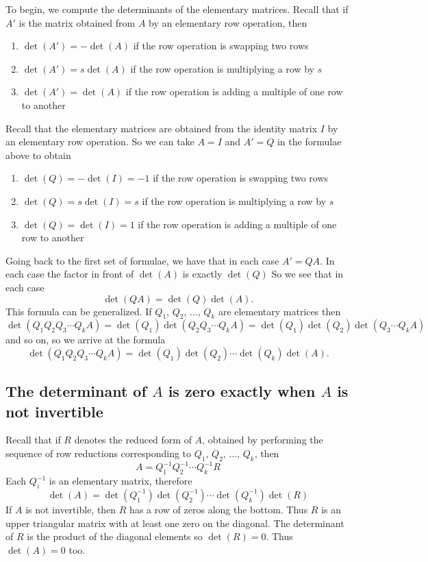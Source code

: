 To begin, we compute the determinants of the elementary
matrices. Recall that if $A'$ is the matrix obtained from $A$ by an
elementary row operation, then
\begin{enumerate}[(1)]
\item $\det(A') = -\det(A)$ if the row operation is swapping two rows
\item $\det(A') = s\det(A)$ if the row operation is multiplying a row by $s$
\item $\det(A') = \det(A)$ if the row operation is adding a multiple
of one row to another
\end{enumerate}
Recall that the elementary matrices are obtained from the identity
matrix $I$ by an elementary row operation. So we can take $A=I$ and
$A'=Q$ in the formulae above to obtain
\begin{enumerate}[(1)]
\item $\det(Q) = -\det(I)=-1$ if the row operation is swapping two rows
\item $\det(Q) = s\det(I)=s$ if the row operation is multiplying a row by $s$
\item $\det(Q) = \det(I)=1$ if the row operation is adding a multiple
of one row to another
\end{enumerate}
Going back to the first set of formulae, we have that in each case
$A'=QA$. In each case the factor in front of $\det(A)$ is exactly
$\det(Q)$ So we see that in each case
\[
\det(QA)=\det(Q)\det(A).
\]
This formula can be generalized. If $Q_1$, $Q_2$, $\ldots$, $Q_k$ are
elementary matrices then $\det(Q_1Q_2Q_3\cdots
Q_kA)=\det(Q_1)\det(Q_2Q_3\cdots Q_kA) =\det(Q_1)
\det(Q_2)\det(Q_3\cdots Q_kA)$ and so on, so we arrive at the formula
\[
\det(Q_1Q_2Q_3\cdots Q_kA)=\det(Q_1)\det(Q_2)\cdots\det(Q_k)\det(A).
\]

\subsection{The determinant of $A$ is zero exactly when $A$ is 
not invertible}
\label{sec:dettheory5}

Recall that if $R$ denotes the reduced form of $A$, obtained by
performing the sequence of row reductions corresponding to $Q_1$,
$Q_2$, $\ldots$, $Q_k$, then
\[
A= Q_1^{-1}Q_2^{-1}\cdots Q_k^{-1}R
\]
Each $Q_i^{-1}$ is an elementary matrix, therefore
\[
\det(A) = \det(Q_1^{-1})\det(Q_2^{-1})\cdots \det(Q_k^{-1})\det(R)
\]
If $A$ is not invertible, then $R$ has a row of zeros along the
bottom. Thus $R$ is an upper triangular matrix with at least one zero
on the diagonal. The determinant of $R$ is the product of the diagonal
elements so $\det(R)=0$.  Thus $\det(A)=0$ too.

